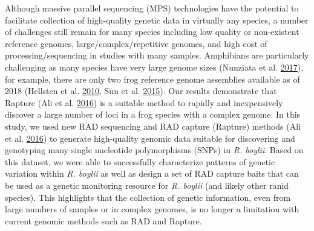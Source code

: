\documentclass[twoside,12pt,final]{ucthesis-CA2012} %
\begin{document}
\begin{ucmainmatter}
Although massive parallel sequencing (MPS) technologies have the
potential to facilitate collection of high-quality genetic data in
virtually any species, a number of challenges still remain for many
species including low quality or non-existent reference genomes,
large/complex/repetitive genomes, and high cost of processing/sequencing
in studies with many samples. Amphibians are particularly challenging as
many species have very large genome sizes (Nunziata et al.
\protect\hyperlink{ref-nunziata_genomic_2017}{2017}), for example, there
are only two frog reference genome assemblies available as of 2018
(Hellsten et al. \protect\hyperlink{ref-hellsten_genome_2010}{2010}, Sun
et al. \protect\hyperlink{ref-sun_whole-genome_2015}{2015}). Our results
demonstrate that Rapture (Ali et al.
\protect\hyperlink{ref-ali_rad_2016}{2016}) is a suitable method to
rapidly and inexpensively discover a large number of loci in a frog
species with a complex genome. In this study, we used new RAD sequencing
and RAD capture (Rapture) methods (Ali et al.
\protect\hyperlink{ref-ali_rad_2016}{2016}) to generate high-quality
genomic data suitable for discovering and genotyping many single
nucleotide polymorphisms (SNPs) in \emph{R. boylii}. Based on this
dataset, we were able to successfully characterize patterns of genetic
variation within \emph{R. boylii} as well as design a set of RAD capture
baits that can be used as a genetic monitoring resource for \emph{R.
boylii} (and likely other ranid species). This highlights that the
collection of genetic information, even from large numbers of samples or
in complex genomes, is no longer a limitation with current genomic
methods such as RAD and Rapture.


\end{ucmainmatter}
\end{document}
